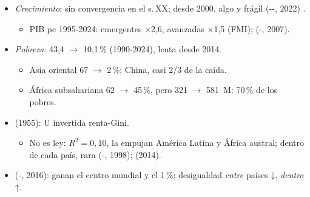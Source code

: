 \documentclass{article}
\begin{document}
\begin{columnas}
\begin{itemize}
\item \emph{Crecimiento}: sin convergencia en el s.\,XX; desde 2000, algo y frágil (--, 2022) .
  \begin{itemize}
  \item PIB pc 1995-2024: emergentes ×2,6, avanzadas ×1,5 (FMI);  (-, 2007).
  \end{itemize}
\item \emph{Pobreza}: 43,4 $\to$ 10,1\,\% (1990-2024), lenta desde 2014.
  \begin{itemize}
  \item Asia oriental 67 $\to$ 2\,\%; China, casi 2/3 de la caída.
  \item África subsahariana 62 $\to$ 45\,\%, pero 321 $\to$ 581~M: 70\,\% de los pobres.
  \end{itemize}
\end{itemize}
\begin{itemize}
\item {} (1955): U invertida renta-Gini.
  \begin{itemize}
  \item No es ley: $R^2=0{,}10$, la empujan América Latina y África austral; dentro de cada país, rara (-, 1998);  (2014).
  \end{itemize}
\item {} (-, 2016): ganan el centro mundial y el 1\,\%; desigualdad \emph{entre} países ↓, \emph{dentro} ↑.
\end{itemize}


\end{columnas}
\end{document}
